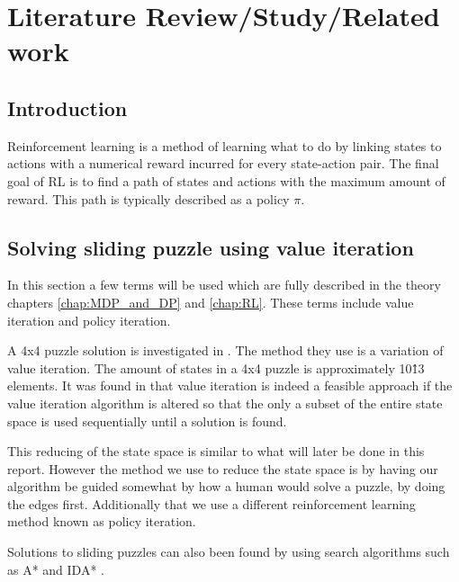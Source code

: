 \graphicspath{{Literature\_Review/fig}}
\chapter{Literature Review/Study/Related work}
\label{chap:Literature_Review}

\section{Introduction}
Reinforcement learning is a method of learning what to do by linking states to actions with a numerical reward incurred for every state-action pair. The final goal of RL is to find a path of states and actions with the maximum amount of reward. \cite{sutton_barto} This path is typically described as a policy $\pi$.

\section{Solving sliding puzzle using value iteration}
In this section a few terms will be used which are fully described in the theory chapters \ref{chap:MDP_and_DP} and \ref{chap:RL}. These terms include value iteration and policy iteration.

A 4x4 puzzle solution is investigated in \cite{15-puzzle_value_iteration}.
The method they use is a variation of value iteration. The amount of states in a 4x4 puzzle is approximately 10\^13 elements.
It was found in \cite{15-puzzle_value_iteration} that value iteration is indeed a feasible approach if the value iteration algorithm is altered so that the only a subset of the entire state space is used sequentially until a solution is found. 

This reducing of the state space is similar to what will later be done in this report. However the method we use to reduce the state space is by having our algorithm be guided somewhat by how a human would solve a puzzle, by doing the edges first. Additionally that we use a different reinforcement learning method known as policy iteration.


Solutions to sliding puzzles can also been found by using search algorithms such as A* and IDA*
\cite{search_alg}.
